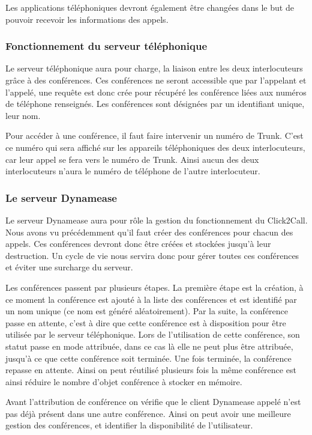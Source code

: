 Les applications téléphoniques devront également être changées dans le but de pouvoir recevoir les informations des appels.

\subsubsection{Fonctionnement du serveur téléphonique}

Le serveur téléphonique aura pour charge, la liaison entre les deux interlocuteurs grâce à des conférences. Ces conférences ne seront accessible que par l'appelant et l'appelé, une requête est donc crée pour récupéré les conférence liées aux numéros de téléphone renseignés. Les conférences sont désignées par un identifiant unique, leur nom.

Pour accéder à une conférence, il faut faire intervenir un numéro de Trunk. C'est ce numéro qui sera affiché sur les appareils téléphoniques des deux interlocuteurs, car leur appel se fera vers le numéro de Trunk. Ainsi aucun des deux interlocuteurs n'aura le numéro de téléphone de l'autre interlocuteur.

\subsubsection{Le serveur Dynamease}

Le serveur Dynamease aura pour rôle la gestion du fonctionnement du Click2Call. Nous avons vu précédemment qu'il faut créer des conférences pour chacun des appels. Ces conférences devront donc être créées et stockées jusqu'à leur destruction. Un cycle de vie nous servira donc pour gérer toutes ces conférences et éviter une surcharge du serveur.

Les conférences passent par plusieurs étapes. La première étape est la création, à ce moment la conférence est ajouté à la liste des conférences et est identifié par un nom unique (ce nom est généré aléatoirement). Par la suite, la conférence passe en attente, c'est à dire que cette conférence est à disposition pour être utilisée par le serveur téléphonique. Lors de l'utilisation de cette conférence, son statut passe en mode attribuée, dans ce cas là elle ne peut plus être attribuée, jusqu'à ce que cette conférence soit terminée. Une fois terminée, la conférence repasse en attente. Ainsi on peut réutilisé plusieurs fois la même conférence est ainsi réduire le nombre d'objet conférence à stocker en mémoire.

Avant l'attribution de conférence on vérifie que le client Dynamease appelé n'est pas déjà présent dans une autre conférence. Ainsi on peut avoir une meilleure gestion des conférences, et identifier la disponibilité de l'utilisateur.

